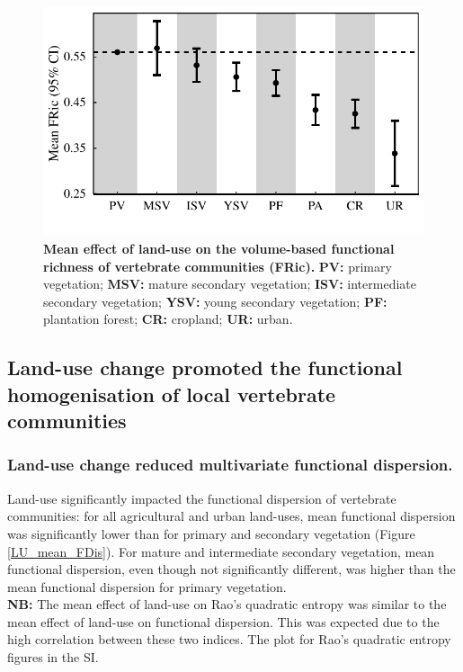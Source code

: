 \begin{figure}[h!]
\centering
\includegraphics[scale=0.70]{figures/chapter3/FRic/Mean_effect_LU}
\caption[Mean effect of land-use on the volume-based functional richness of vertebrate communities (FRic)]{\textbf{Mean effect of land-use on the volume-based functional richness of vertebrate communities (FRic).} \textbf{PV:} primary vegetation; \textbf{MSV:} mature secondary vegetation; \textbf{ISV:} intermediate secondary vegetation; \textbf{YSV:} young secondary vegetation; \textbf{PF:} plantation forest; \textbf{CR:} cropland; \textbf{UR:} urban.}
\label{LU_mean_FRic}
\end{figure}


\subsection{Land-use change promoted the functional homogenisation of local vertebrate communities}

\subsubsection{Land-use change reduced multivariate functional dispersion.}

Land-use significantly impacted the functional dispersion of vertebrate communities: for all agricultural and urban land-uses, mean functional dispersion was significantly lower than for primary and secondary vegetation (Figure \ref{LU_mean_FDis}). For mature and intermediate secondary vegetation, mean functional dispersion, even though not significantly different, was higher than the mean functional dispersion for primary vegetation. \\ 
\textbf{NB:} The mean effect of land-use on Rao's quadratic entropy was similar to the mean effect of land-use on functional dispersion. This was expected due to the high correlation between these two indices. The plot for Rao's quadratic entropy figures in the SI.

